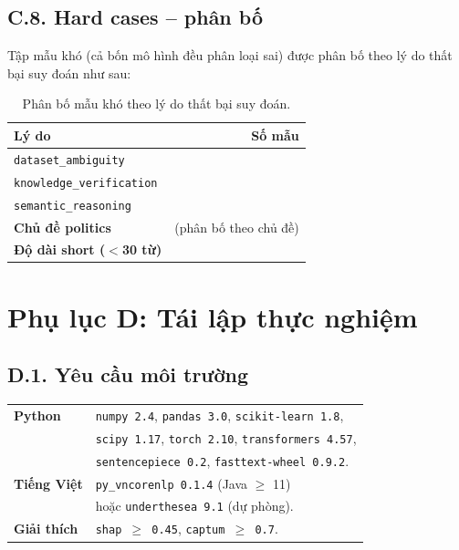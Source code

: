 \subsection*{C.8. Hard cases -- phân bố}

Tập \nhardexamples{} mẫu khó (cả bốn mô hình đều phân loại sai) được phân bố theo lý do thất bại suy đoán như sau:

\begin{table}[H]
  \centering
  \small
  \caption[Phân bố hard cases theo lý do]{Phân bố \nhardexamples{} mẫu khó theo lý do thất bại suy đoán.}
  \label{tab:appendix_hard_reasons}
  \begin{tabular}{l r}
    \toprule
    \textbf{Lý do} & \textbf{Số mẫu} \\
    \midrule
    \texttt{dataset\_ambiguity}      & \nhardambiguity{} \\
    \texttt{knowledge\_verification} & \nhardknowledge{} \\
    \texttt{semantic\_reasoning}     & \nhardsemantic{} \\
    \midrule
    \textbf{Chủ đề politics}        & \nhardpolitics{} (phân bố theo chủ đề) \\
    \textbf{Độ dài short ($<$30 từ)} & \nhardshort{} \\
    \bottomrule
  \end{tabular}
\end{table}

\section*{Phụ lục D: Tái lập thực nghiệm}

\subsection*{D.1. Yêu cầu môi trường}

\noindent\begin{tabular}{@{}l@{\;}l@{}}
\textbf{Python}     & \texttt{numpy 2.4}, \texttt{pandas 3.0}, \texttt{scikit-learn 1.8}, \\
                    & \texttt{scipy 1.17}, \texttt{torch 2.10}, \texttt{transformers 4.57}, \\
                    & \texttt{sentencepiece 0.2}, \texttt{fasttext-wheel 0.9.2}. \\
\textbf{Tiếng Việt} & \texttt{py\_vncorenlp 0.1.4} (Java $\geq$ 11) \\
                    & hoặc \texttt{underthesea 9.1} (dự phòng). \\
\textbf{Giải thích} & \texttt{shap $\geq$ 0.45}, \texttt{captum $\geq$ 0.7}. \\
\end{tabular}

